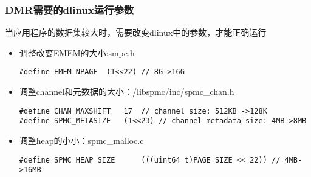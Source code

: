 \subsubsection{DMR需要的dlinux运行参数}
当应用程序的数据集较大时，需要改变dlinux中的参数，才能正确运行
\begin{itemize}
  \item 调整改变EMEM的大小:smpc.h
\begin{lstlisting}
#define EMEM_NPAGE  (1<<22) // 8G->16G
\end{lstlisting}
  \item 调整channel和元数据的大小：/libspmc/inc/spmc\_chan.h
\begin{lstlisting}
#define CHAN_MAXSHIFT   17  // channel size: 512KB ->128K
#define SPMC_METASIZE   (1<<23) // channel metadata size: 4MB->8MB
\end{lstlisting}
  \item 调整heap的小小：spmc\_malloc.c
\begin{lstlisting}
#define SPMC_HEAP_SIZE      (((uint64_t)PAGE_SIZE << 22)) // 4MB->16MB
\end{lstlisting}
\end{itemize}
